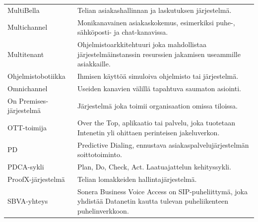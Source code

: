 \documentclass[finnish,12pt,a4paper,pdftex]{article}
\begin{document}
\begin{table}[h!]
\centering
\label{my-label}

\begin{tabular}{ p{5cm}  p{\textwidth-6cm} }

MultiBella                  & Telian asiakashallinnan ja laskutuksen järjestelmä.                                                                                               \\[0.9em]
Multichannel                & Monikanavainen asiakaskokemus, esimerkiksi puhe-, sähköposti- ja chat-kanavissa.                                                                 \\[0.9em]
Multitenant                 & Ohjelmistoarkkitehtuuri joka mahdollistaa järjestelmäinstanssin resurssien jakamisen useammille asiakkaille.                                     \\[0.9em]
Ohjelmistobotiikka          & Ihmisen käyttöä simuloiva ohjelmisto tai järjestelmä.                                                                                            \\[0.9em]
Omnichannel                 & Useiden kanavien välillä tapahtuva saumaton asiointi.                                                                                            \\[0.9em]
On Premises-järjestelmä     & Järjestelmä joka toimii organisaation omissa tiloissa.                                                                                           \\[0.9em]
OTT-toimija                 & Over the Top, aplikaatio tai palvelu, joka tuotetaan Intenetin yli ohittaen perinteisen jakeluverkon.                                            \\[0.9em]
PD                          & Predictive Dialing, ennustava asiakaspalvelujärjestelmän soittotoiminto.                                                                         \\[0.9em]
PDCA-sykli                  & Plan, Do, Check, Act. Laatuajattelun kehityssykli.                                                                                               \\[0.9em]
ProofX-järjestelmä          & Telian lomakkeiden hallintajärjestelmä.                                                                                                          \\[0.9em]
SBVA-yhteys                 & Sonera Business Voice Access on SIP-puheliittymä, joka yhdistää Datanetin kautta tulevan puheliikenteen puhelinverkkoon.                         \\[0.9em]

\end{tabular}
\end{table}
\end{document}
